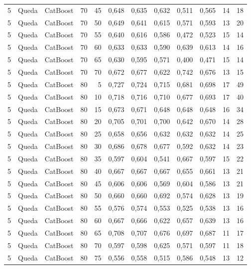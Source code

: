 \begin{longtable}{@{}rllrrrrrrrrr@{}}
5 & Queda & CatBoost & 70 & 45 & 0,648 & 0,635 & 0,632 & 0,511 & 0,565 & 14 & 18 \\
5 & Queda & CatBoost & 70 & 50 & 0,649 & 0,641 & 0,615 & 0,571 & 0,593 & 13 & 20 \\
5 & Queda & CatBoost & 70 & 55 & 0,640 & 0,616 & 0,586 & 0,472 & 0,523 & 15 & 14 \\
5 & Queda & CatBoost & 70 & 60 & 0,633 & 0,633 & 0,590 & 0,639 & 0,613 & 14 & 16 \\
5 & Queda & CatBoost & 70 & 65 & 0,630 & 0,595 & 0,571 & 0,400 & 0,471 & 15 & 14 \\
5 & Queda & CatBoost & 70 & 70 & 0,672 & 0,677 & 0,622 & 0,742 & 0,676 & 13 & 15 \\
5 & Queda & CatBoost & 80 & 5 & 0,727 & 0,724 & 0,715 & 0,681 & 0,698 & 17 & 49 \\
5 & Queda & CatBoost & 80 & 10 & 0,718 & 0,716 & 0,710 & 0,677 & 0,693 & 17 & 40 \\
5 & Queda & CatBoost & 80 & 15 & 0,673 & 0,671 & 0,648 & 0,648 & 0,648 & 16 & 34 \\
5 & Queda & CatBoost & 80 & 20 & 0,705 & 0,701 & 0,700 & 0,642 & 0,670 & 14 & 28 \\
5 & Queda & CatBoost & 80 & 25 & 0,658 & 0,656 & 0,632 & 0,632 & 0,632 & 14 & 25 \\
5 & Queda & CatBoost & 80 & 30 & 0,686 & 0,678 & 0,677 & 0,592 & 0,632 & 14 & 23 \\
5 & Queda & CatBoost & 80 & 35 & 0,597 & 0,604 & 0,541 & 0,667 & 0,597 & 15 & 22 \\
5 & Queda & CatBoost & 80 & 40 & 0,667 & 0,667 & 0,667 & 0,655 & 0,661 & 13 & 21 \\
5 & Queda & CatBoost & 80 & 45 & 0,606 & 0,606 & 0,569 & 0,604 & 0,586 & 13 & 21 \\
5 & Queda & CatBoost & 80 & 50 & 0,660 & 0,660 & 0,692 & 0,574 & 0,628 & 13 & 19 \\
5 & Queda & CatBoost & 80 & 55 & 0,576 & 0,574 & 0,553 & 0,525 & 0,538 & 13 & 16 \\
5 & Queda & CatBoost & 80 & 60 & 0,667 & 0,666 & 0,622 & 0,657 & 0,639 & 13 & 16 \\
5 & Queda & CatBoost & 80 & 65 & 0,708 & 0,707 & 0,676 & 0,697 & 0,687 & 11 & 17 \\
5 & Queda & CatBoost & 80 & 70 & 0,597 & 0,598 & 0,625 & 0,571 & 0,597 & 11 & 18 \\
5 & Queda & CatBoost & 80 & 75 & 0,556 & 0,558 & 0,515 & 0,586 & 0,548 & 13 & 12 \\

\end{longtable}
